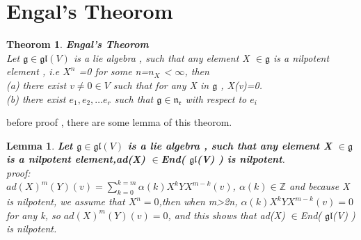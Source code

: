 \documentclass[UTF8]{ctexart}
\newtheorem{theorom}{Theorom}[section]
\newtheorem{lemma}{Lemma}[section]
\begin{document}
\section{Engal's Theorom}
\begin{theorom}
    \textbf{Engal's Theorom}
    \\ Let $\mathfrak{g} \in \mathfrak{gl}(V)$ is a lie algebra ,  such that any element X $\in \mathfrak{g}$ is a nilpotent element
    , i.e $X^n$ =0 for some  n=$n_{X}$ < $ \infty $,
    then
    \\(a) there exist $v \neq 0 \in V$ such that for any X in $ \mathfrak{g} $ , X(v)=0. 
    \\(b) there exist {$e_1, e_2, \dots e_r $ } such that $\mathfrak{g} \in \mathfrak{n_r} $ with respect to {$e_i$} 

\end{theorom}
before proof , there are some lemma of this theorom. 
\begin{lemma}
    \textbf{ Let $\mathfrak{g} \in \mathfrak{gl}(V)$ is a lie algebra ,  such that any element X $\in \mathfrak{g}$ is a nilpotent element,ad(X) $\in $End( $\mathfrak{gl}$(V) ) is nilpotent}. 
    \\proof:
    \\ $ad(X)^m(Y)(v)=\sum_{k=0}^{k=m} \alpha(k)X^kYX^{m-k}(v)$, $\alpha(k) \in \mathbb{Z} $  and because X is nilpotent, we assume that $X^n=0$,then when m>2n,
    $\alpha(k)X^kYX^{m-k}(v)=0$ for any k, so $ad(X)^m(Y)(v)=0$, and this shows that ad(X) $\in $End( $\mathfrak{gl}$(V) ) is nilpotent.
\end{lemma}
\end{document}
